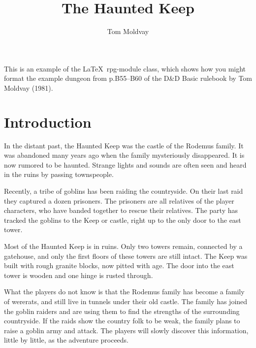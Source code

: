 \documentclass[letterpaper,serif]{rpg-module}
\begin{document}

\title{The Haunted Keep}
\author{Tom Moldvay}
\maketitle


\showtitle

This is an example of the \LaTeX~rpg-module class, which shows how you might
format the example dungeon from p.B55--B60 of the D\&D Basic rulebook by Tom
Moldvay (1981).


\part{Introduction}


\begin{boxtext}
In the distant past, the Haunted Keep was the castle of the Rodemus family. It
was abandoned many years ago when the family mysteriously disappeared. It is
now rumored to be haunted. Strange lights and sounds are often seen and heard
in the ruins by passing townspeople.

Recently, a tribe of goblins has been raiding the countryside. On
their last raid they captured a dozen prisoners. The prisoners are all
relatives of the player characters, who have banded together to
rescue their relatives. The party has tracked the goblins to the Keep
or castle, right up to the only door to the east tower.

Most of the Haunted Keep is in ruins. Only two towers remain,
connected by a gatehouse, and only the first floors of these towers
are still intact. The Keep was built with rough granite blocks, now
pitted with age. The door into the east tower is wooden and one
hinge is rusted through.
\end{boxtext}

What the players do not know is that the Rodemus family has become
a family of wererats, and still live in tunnels under their old
castle. The family has joined the goblin raiders and are using them
to find the strengths of the surrounding countryside. If the raids
show the country folk to be weak, the family plans to raise a goblin
army and attack. The players will slowly discover this information,
little by little, as the adventure proceeds.
\end{document}
